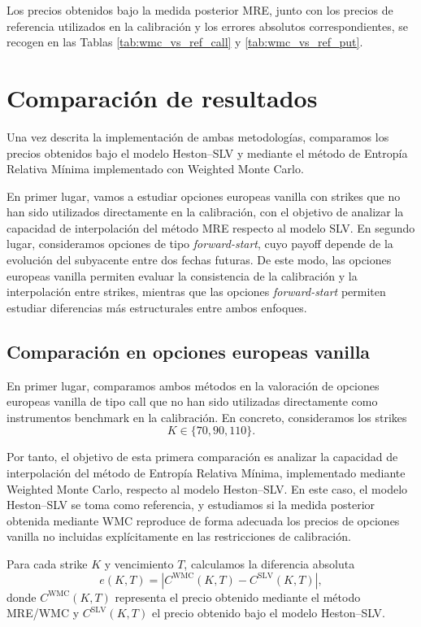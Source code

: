 Los precios obtenidos bajo la medida posterior MRE, junto con los precios de referencia utilizados en la calibración y los errores absolutos correspondientes, se recogen en las Tablas \ref{tab:wmc_vs_ref_call} y \ref{tab:wmc_vs_ref_put}.


\section{Comparación de resultados}

Una vez descrita la implementación de ambas metodologías, comparamos los precios obtenidos bajo el modelo Heston--SLV y mediante el método de Entropía Relativa Mínima implementado con Weighted Monte Carlo.\medskip

 En primer lugar, vamos a estudiar opciones europeas vanilla con strikes que no han sido utilizados directamente en la calibración, con el objetivo de analizar la capacidad de interpolación del método MRE respecto al modelo SLV. En segundo lugar, consideramos opciones de tipo \textit{forward-start}, cuyo payoff depende de la evolución del subyacente entre dos fechas futuras. De este modo, las opciones europeas vanilla permiten evaluar la consistencia de la calibración y la interpolación entre strikes, mientras que las opciones \textit{forward-start} permiten estudiar diferencias más estructurales entre ambos enfoques.


\subsection{Comparación en opciones europeas vanilla}

En primer lugar, comparamos ambos métodos en la valoración de opciones europeas
vanilla de tipo call que no han sido utilizadas directamente como instrumentos
benchmark en la calibración. En concreto, consideramos los strikes
\[
K \in \{70,90,110\}.
\]


Por tanto, el objetivo de esta primera comparación es analizar la capacidad de
interpolación del método de Entropía Relativa Mínima, implementado mediante
Weighted Monte Carlo, respecto al modelo Heston--SLV. En este caso, el
modelo Heston--SLV se toma como referencia, y estudiamos si la medida posterior
obtenida mediante WMC reproduce de forma adecuada los precios de opciones
vanilla no incluidas explícitamente en las restricciones de calibración.

Para cada strike \(K\) y vencimiento \(T\), calculamos la diferencia absoluta
\[
e(K,T)
=
\left|
C^{\mathrm{WMC}}(K,T)
-
C^{\mathrm{SLV}}(K,T)
\right|,
\]
donde \(C^{\mathrm{WMC}}(K,T)\) representa el precio obtenido mediante el método
MRE/WMC y \(C^{\mathrm{SLV}}(K,T)\) el precio obtenido bajo el modelo Heston--SLV.\medskip

